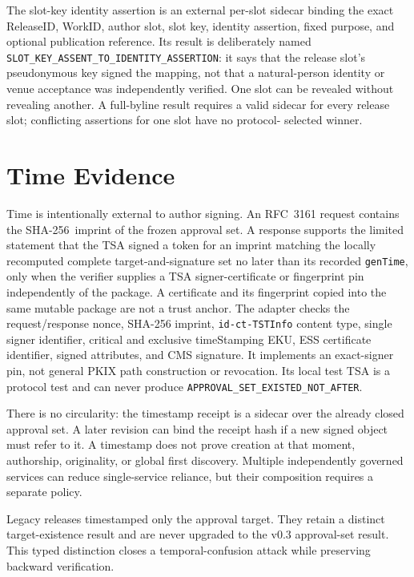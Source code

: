 \documentclass[11pt]{article}
\newcommand{\releaseid}{\textsf{ReleaseID}}
\newcommand{\sha}{\textsf{SHA-256}}
\begin{document}
The slot-key identity assertion is an external per-slot sidecar binding the exact
\releaseid, WorkID, author slot, slot key, identity assertion, fixed purpose,
and optional publication reference. Its result is deliberately named
\texttt{SLOT\_KEY\_ASSENT\_TO\_IDENTITY\_ASSERTION}: it says that the release
slot's pseudonymous key signed the mapping, not that a natural-person identity
or venue acceptance was independently verified. One slot can be revealed
without revealing another. A full-byline result requires a valid sidecar for
every release slot; conflicting assertions for one slot have no protocol-
selected winner.

\section{Time Evidence}

Time is intentionally external to author signing. An RFC~3161 request contains
the \sha\ imprint of the frozen approval set. A response supports the limited
statement that the TSA signed a token for an imprint matching the locally
recomputed complete target-and-signature set no later than its recorded
\texttt{genTime}, only when the verifier supplies a TSA signer-certificate or
fingerprint pin independently of the package. A certificate and its fingerprint
copied into the same mutable package are not a trust anchor. The adapter checks
the request/response nonce, SHA-256 imprint, \texttt{id-ct-TSTInfo} content type,
single signer identifier, critical and exclusive timeStamping EKU, ESS
certificate identifier, signed attributes, and CMS signature. It implements an
exact-signer pin, not general PKIX path construction or revocation. Its local
test TSA is a protocol test and can never produce
\texttt{APPROVAL\_SET\_EXISTED\_NOT\_AFTER}.

There is no circularity: the timestamp receipt is a sidecar over the already
closed approval set. A later revision can bind the receipt hash if a new signed object
must refer to it. A timestamp does not prove creation at that moment,
authorship, originality, or global first discovery. Multiple independently
governed services can reduce single-service reliance, but their composition
requires a separate policy.

Legacy releases timestamped only the approval target. They retain a distinct
target-existence result and are never upgraded to the v0.3 approval-set result.
This typed distinction closes a temporal-confusion attack while preserving
backward verification.
\end{document}
